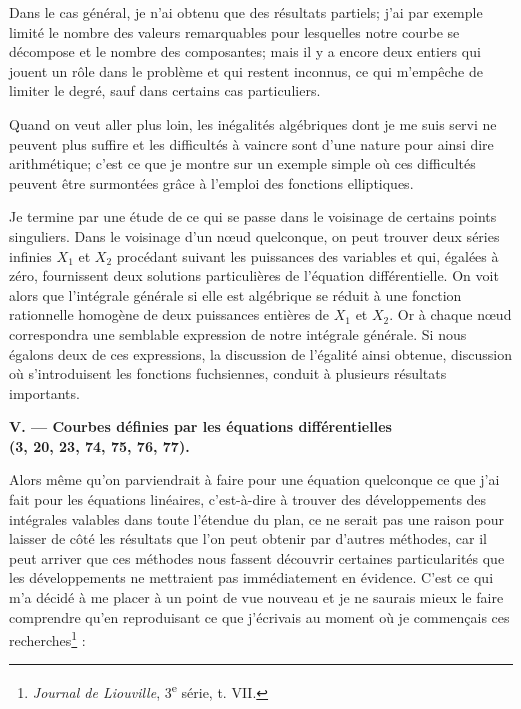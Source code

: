 \documentclass[11pt]{article}
\begin{document}
Dans le cas général, je n’ai obtenu que des résultats partiels; j’ai par exemple limité le nombre des valeurs remarquables pour lesquelles notre courbe se décompose et le nombre des composantes; mais il y a encore deux entiers qui jouent un rôle dans le problème et qui restent inconnus, ce qui m’empêche de limiter le degré, sauf dans certains cas particuliers.

Quand on veut aller plus loin, les inégalités algébriques dont je me suis servi ne peuvent plus suffire et les difficultés à vaincre sont d’une nature pour ainsi dire arithmétique; c’est ce que je montre sur un exemple simple où ces difficultés peuvent être surmontées grâce à l’emploi des fonctions elliptiques.

Je termine par une étude de ce qui se passe dans le voisinage de certains points singuliers. Dans le voisinage d’un nœud quelconque, on peut trouver deux séries infinies $X_1$ et $X_2$ procédant suivant les puissances des variables et qui, égalées à zéro, fournissent deux solutions particulières de l’équation différentielle. On voit alors que l’intégrale générale si elle est algébrique se réduit à une fonction rationnelle homogène de deux puissances entières de $X_1$ et $X_2$. Or à chaque nœud correspondra une semblable expression de notre intégrale générale. Si nous égalons deux de ces expressions, la discussion de l’égalité ainsi obtenue, discussion où s’introduisent les fonctions fuchsiennes, conduit à plusieurs résultats importants.

\begin{center}
\textbf{V. — Courbes définies par les équations différentielles\\
(3, 20, 23, 74, 75, 76, 77).}
\end{center}

Alors même qu’on parviendrait à faire pour une équation quelconque ce que j’ai fait pour les équations linéaires, c’est-à-dire à trouver des développements des intégrales valables dans toute l’étendue du plan, ce ne serait pas une raison pour laisser de côté les résultats que l’on peut obtenir par d’autres méthodes, car il peut arriver que ces méthodes nous fassent découvrir certaines particularités que les développements ne mettraient pas immédiatement en évidence. C’est ce qui m’a décidé à me placer à un point de vue nouveau et je ne saurais mieux le faire comprendre qu’en reproduisant ce que j’écrivais au moment où je commençais ces recherches\footnote[1]{\emph{Journal de Liouville}, 3\textsuperscript{e} série, t. VII.} :
\end{document}
